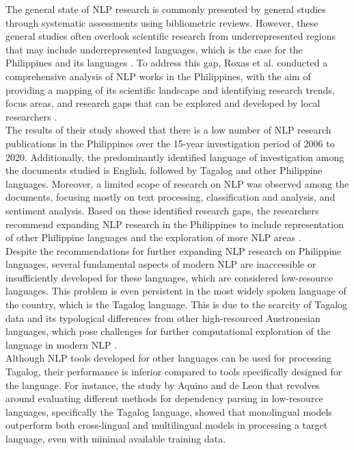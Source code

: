 \documentclass[journal]{./IEEE/IEEEtran}
\begin{document}
The general state of NLP research is commonly presented by general studies through systematic assessments using bibliometric reviews. However, these general studies often overlook scientific research from underrepresented regions that may include underrepresented languages, which is the case for the Philippines and its languages {\cite{NLPInPH}}. To address this gap, Roxas et al. {\cite{NLPInPH}} conducted a comprehensive analysis of NLP works in the Philippines, with the aim of providing a mapping of its scientific landscape and identifying research trends, focus areas, and research gaps that can be explored and developed by local researchers {\cite{NLPInPH}}. \\

The results of their study showed that there is a low number of NLP research publications in the Philippines over the 15-year investigation period of 2006 to 2020. Additionally, the predominantly identified language of investigation among the documents studied is English, followed by Tagalog and other Philippine languages. Moreover, a limited scope of research on NLP was observed among the documents, focusing mostly on text processing, classification and analysis, and sentiment analysis. Based on these identified research gaps, the researchers recommend expanding NLP research in the Philippines to include representation of other Philippine languages and the exploration of more NLP areas {\cite{NLPInPH}}. \\

Despite the recommendations for further expanding NLP research on Philippine languages, several fundamental aspects of modern NLP are inaccessible or insufficiently developed for these languages, which are considered low-resource languages. This problem is even persistent in the most widely spoken language of the country, which is the Tagalog language. This is due to the scarcity of Tagalog data and its typological differences from other high-resourced Austronesian languages, which pose challenges for further computational exploration of the language in modern NLP {\cite{TweetTaglish}}. \\

Although NLP tools developed for other languages can be used for processing Tagalog, their performance is inferior compared to tools specifically designed for the language. For instance, the study by Aquino and de Leon {\cite{Ugnayan}} that revolves around evaluating different methods for dependency parsing in low-resource languages, specifically the Tagalog language, showed that monolingual models outperform both cross-lingual and multilingual models in processing a target language, even with minimal available training data. \\
\end{document}
